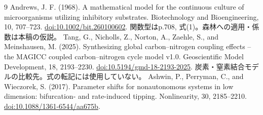 \documentclass[a4paper,11pt]{ltjsarticle}
\begin{document}
\begin{thebibliography}{9}
 Andrews, J. F. (1968).
A mathematical model for the continuous culture of microorganisms utilizing inhibitory substrates.
Biotechnology and Bioengineering, 10, 707--723.
\href{https://doi.org/10.1002/bit.260100602}{doi:10.1002/bit.260100602}.
関数型はp.708, 式(1)。森林への適用・係数は本稿の仮説。
 Tang, G., Nicholls, Z., Norton, A., Zaehle, S., and Meinshausen, M. (2025).
Synthesizing global carbon--nitrogen coupling effects -- the MAGICC coupled carbon--nitrogen cycle model v1.0.
Geoscientific Model Development, 18, 2193--2230.
\href{https://doi.org/10.5194/gmd-18-2193-2025}{doi:10.5194/gmd-18-2193-2025}.
炭素・窒素結合モデルの比較先。式の転記には使用していない。
 Ashwin, P., Perryman, C., and Wieczorek, S. (2017).
Parameter shifts for nonautonomous systems in low dimension: bifurcation- and rate-induced tipping.
Nonlinearity, 30, 2185--2210.
\href{https://doi.org/10.1088/1361-6544/aa675b}{doi:10.1088/1361-6544/aa675b}.
\end{thebibliography}
\end{document}
